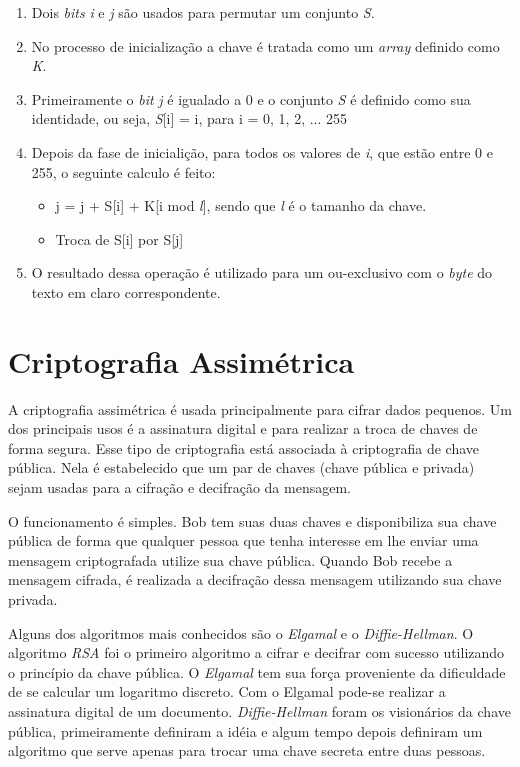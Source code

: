 \begin{enumerate}
	\item Dois \textit{bits} \textit{i} e \textit{j} são usados para permutar um conjunto \textit{S}.
	\item No processo de inicialização a chave é tratada como um \textit{array} definido como \textit{K}.
	\item Primeiramente o \textit{bit} \textit{j} é igualado a 0 e o conjunto \textit{S} é definido como sua identidade, ou seja, \textit{S}[i] = i, para i = 0, 1, 2, ... 255
	\item Depois da fase de inicialição, para todos os valores de \textit{i}, que estão entre 0 e 255, o seguinte calculo é feito:
	\begin{itemize}
		\item j = j + S[i] + K[i mod \textit{l}], sendo que \textit{l} é o tamanho da chave.
		\item Troca de S[i] por S[j]	
	\end{itemize}	 
	\item O resultado dessa operação é utilizado para um ou-exclusivo com o \textit{byte} do texto em claro correspondente.
\end{enumerate} 

%
\section{Criptografia Assimétrica}
\label{assymmetric-cryptography}

%
A criptografia assimétrica é usada principalmente para cifrar dados pequenos. Um dos principais usos é a assinatura digital e para realizar a troca de chaves de forma segura. Esse tipo de criptografia está associada à criptografia de chave pública. Nela é estabelecido que um par de chaves (chave pública e privada) sejam usadas para a cifração e decifração da mensagem. 

%
O funcionamento é simples. Bob tem suas duas chaves e disponibiliza sua chave pública de forma que qualquer pessoa que tenha interesse em lhe enviar uma mensagem criptografada utilize sua chave pública. Quando Bob recebe a mensagem cifrada, é realizada a decifração dessa mensagem utilizando sua chave privada.

%
Alguns dos algoritmos mais conhecidos são o \textit{Elgamal} e o \textit{Diffie-Hellman}. O algoritmo \textit{RSA} foi o primeiro algoritmo a cifrar e decifrar com sucesso utilizando o princípio da chave pública. O \textit{Elgamal} tem sua força proveniente da dificuldade de se calcular um logaritmo discreto. Com o Elgamal pode-se realizar a assinatura digital de um documento. \textit{Diffie-Hellman} foram os visionários da chave pública, primeiramente definiram a idéia e algum tempo depois definiram um algoritmo que serve apenas para trocar uma chave secreta entre duas pessoas. 

